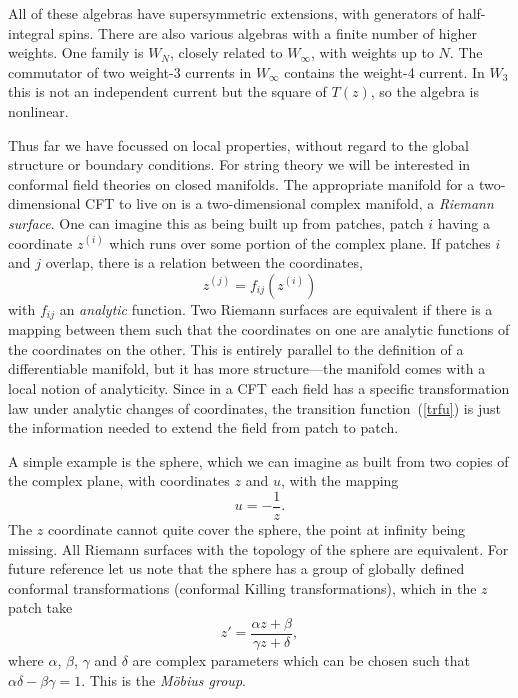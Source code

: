 All of these algebras have supersymmetric extensions,
with generators of half-integral spins.  There are also various
algebras with a finite number of higher weights.  One family is
$W_N$, closely related to $W_\infty$, with weights up to $N$.
The commutator of two weight-3 currents in $W_\infty$ contains
the weight-4 current.  In $W_3$ this is not an independent current
but the square of $T(z)$, so the algebra is nonlinear.


Thus far we have focussed on local properties, without regard to
the global structure or boundary conditions.  For string theory we
will be interested in conformal field theories on closed manifolds.
The appropriate manifold for a two-dimensional CFT to live on is a
two-dimensional complex manifold, a {\it Riemann surface}.  One can
imagine this as being built up from patches, patch $i$ having a
coordinate $z^{(i)}$ which runs over some portion of the complex
plane.  If patches $i$ and $j$ overlap,
there is a relation between the
coordinates,
\begin{equation}
z^{(j)} = f_{ij}(z^{(i)})  \label{trfu}
\end{equation}
with $f_{ij}$ an {\it analytic} function.  Two Riemann surfaces
are equivalent if there is a mapping between them such that
the coordinates on one are analytic functions of the coordinates on
the other.  This is entirely parallel to the definition of a
differentiable manifold, but it has more structure---the manifold
comes with a local notion of analyticity.  Since in a CFT each field
has a specific transformation law under analytic changes of
coordinates, the transition function~(\ref{trfu}) is just the
information needed to extend the field from patch to patch.

A simple example is the sphere, which we can imagine as built from
two copies of the complex plane, with coordinates $z$ and $u$, with
the mapping
\begin{equation}
u = -\frac{1}{z}.
\end{equation}
The $z$ coordinate cannot quite cover the sphere, the point at
infinity being missing.
All Riemann surfaces with the topology of the sphere are equivalent.
For future reference let us note that the sphere has a group of
globally defined conformal transformations
(conformal Killing transformations), which in the $z$ patch
take
\begin{equation}
z' = \frac{\alpha z + \beta}{\gamma z + \delta}, \label{mob}
\end{equation}
where $\alpha$, $\beta$, $\gamma$ and $\delta$ are complex
parameters which can be chosen such that
$\alpha \delta - \beta \gamma = 1$.  This is the {\it M\"obius
group}.

